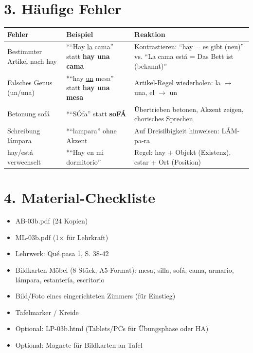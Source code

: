 \documentclass[11pt, a4paper]{article}
\newcommand{\fachfarbe}{spanisch}
\newcommand{\sequenz}{03}
\newcommand{\block}{b}
\newcommand{\lerngruppengroesse}{24}
\newcommand{\es}[1]{\textcolor{\fachfarbe}{\textbf{#1}}}
\begin{document}

\section*{3. Häufige Fehler}

\begin{fehlerbox}
\begin{tabularx}{\textwidth}{|l|X|X|}
\hline
\textbf{Fehler} & \textbf{Beispiel} & \textbf{Reaktion} \\
\hline
Bestimmter Artikel nach hay & *``Hay \underline{la} cama'' statt \es{hay una cama} & Kontrastieren: ``hay = es gibt (neu)'' vs. ``La cama está = Das Bett ist (bekannt)'' \\
\hline
Falsches Genus (un/una) & *``hay \underline{un} mesa'' statt \es{hay una mesa} & Artikel-Regel wiederholen: la $\rightarrow$ una, el $\rightarrow$ un \\
\hline
Betonung sofá & *``SÓfa'' statt \es{soFÁ} & Übertrieben betonen, Akzent zeigen, chorisches Sprechen \\
\hline
Schreibung lámpara & *``lampara'' ohne Akzent & Auf Dreisilbigkeit hinweisen: LÁM-pa-ra \\
\hline
hay/está verwechselt & *``Hay en mi dormitorio'' & Regel: hay + Objekt (Existenz), estar + Ort (Position) \\
\hline
\end{tabularx}
\end{fehlerbox}


\section*{4. Material-Checkliste}

\begin{materialbox}
\begin{itemize}[label=$\square$]
    \item AB-\sequenz\block.pdf (\lerngruppengroesse{} Kopien)
    \item ML-\sequenz\block.pdf (1$\times$ für Lehrkraft)
    \item Lehrwerk: Qué pasa 1, S. 38-42
    \item Bildkarten Möbel (8 Stück, A5-Format): mesa, silla, sofá, cama, armario, lámpara, estantería, escritorio
    \item Bild/Foto eines eingerichteten Zimmers (für Einstieg)
    \item Tafelmarker / Kreide
    \item Optional: LP-\sequenz\block.html (Tablets/PCs für Übungsphase oder HA)
    \item Optional: Magnete für Bildkarten an Tafel
\end{itemize}
\end{materialbox}
\end{document}
